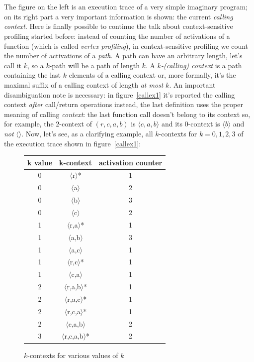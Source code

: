 \documentclass[a4paper,11pt]{report}
\begin{document}
\mbox{}\\ \mbox{}\\
The figure on the left is an execution trace of a very simple imaginary program; on its right part a very important information is shown: the current \emph{calling context}. 
Here is finally possible to continue the talk about context-sensitive profiling started before: instead of counting the number of activations of a function (which is called \emph{vertex profiling}), in context-sensitive profiling we count the number of activations of a \emph{path}. A path can have an arbitrary length, let's call it $k$, so a $k$-path will be a path of length $k$. A \emph{\mbox{$k$-(calling)} context} is a path containing the last $k$ elements of a calling context or, more formally, it's the maximal suffix of a calling context of length \emph{at most} $k$.
An important disambiguation note is necessary: in figure~\ref{callex1} it's reported the calling context \emph{after} call/return operations instead, the last definition uses the proper meaning of calling \emph{context}: the last function call doesn't belong to its context so, for example, the $2$-context of $(r,c,a,b)$ is $\langle c,a,b\rangle$ and its $0$-context is $\langle b\rangle$ and \emph{not} $\langle\rangle$.
Now, let's see, as a clarifying example, all $k$-contexts for $k=0,1,2,3$ of the execution trace shown in figure~\ref{callex1}:

\begin{figure}[h]
\begin{center}
\begin{tabular}{c|c|c}
\textbf{k value} & \textbf{k-context} & \textbf{activation counter}\\
\hline
0 & $\langle$r$\rangle$* & 1\\
0 & $\langle$a$\rangle$ & 2\\
0 & $\langle$b$\rangle$ & 3\\
0 & $\langle$c$\rangle$ & 2\\
\hline
1 & $\langle$r,a$\rangle$* & 1\\
1 & $\langle$a,b$\rangle$ & 3\\
1 & $\langle$a,c$\rangle$ & 1\\
1 & $\langle$r,c$\rangle$* & 1\\
1 & $\langle$c,a$\rangle$ & 1\\
\hline
2 & $\langle$r,a,b$\rangle$* & 1\\
2 & $\langle$r,a,c$\rangle$* & 1\\
2 & $\langle$r,c,a$\rangle$* & 1\\
2 & $\langle$c,a,b$\rangle$ & 2\\
\hline
3 & $\langle$r,c,a,b$\rangle$* & 2\\

\end{tabular}
\end{center}
\caption{$k$-contexts for various values of $k$}
\end{figure}
\end{document}
